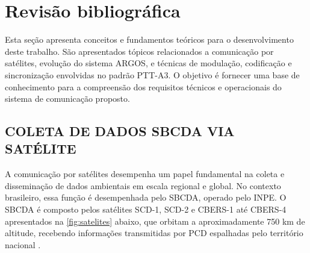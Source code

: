 \chapter{Revisão bibliográfica}\label{cap:revisao}

Esta seção apresenta conceitos e fundamentos teóricos para o desenvolvimento deste trabalho. São apresentados tópicos relacionados a comunicação por satélites, evolução do sistema ARGOS, e técnicas de modulação, codificação e sincronização envolvidas no padrão \gls{PTT-A3}. O objetivo é fornecer uma base de conhecimento para a compreensão dos requisitos técnicos e operacionais do sistema de comunicação proposto.

\section{COLETA DE DADOS SBCDA VIA SATÉLITE }\label{sec:sbcda}

A comunicação por satélites desempenha um papel fundamental na coleta e disseminação de dados ambientais em escala regional e global. No contexto brasileiro, essa função é desempenhada pelo \gls{SBCDA}, operado pelo \gls{INPE}. O \gls{SBCDA} é composto pelos satélites \gls{SCD-1}, \gls{SCD-2} e \gls{CBERS-1} até \gls{CBERS-4} apresentados na \autoref{fig:satelites} abaixo, que orbitam a aproximadamente 750 km de altitude, recebendo informações transmitidas por \gls{PCD} espalhadas pelo território nacional \cite{lima_parallel_2021}.


